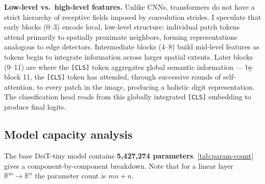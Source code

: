 \documentclass[11pt]{article}
\begin{document}
\textbf{Low-level vs.\ high-level features.} Unlike CNNs, transformers do not have a strict hierarchy of receptive fields imposed by convolution strides. I speculate that early blocks (0--3) encode local, low-level structure: individual patch tokens attend primarily to spatially proximate neighbors, forming representations analogous to edge detectors. Intermediate blocks (4--8) build mid-level features as tokens begin to integrate information across larger spatial extents. Later blocks (9--11) are where the \texttt{[CLS]} token aggregates global semantic information — by block 11, the \texttt{[CLS]} token has attended, through successive rounds of self-attention, to every patch in the image, producing a holistic digit representation. The classification head reads from this globally integrated \texttt{[CLS]} embedding to produce final logits.

\subsection{Model capacity analysis}\label{sec:model-capacity}

The base DeiT-tiny model contains \textbf{5,427,274 parameters}. \autoref{tab:param-count} gives a component-by-component breakdown. Note that for a linear layer $\mathbb{R}^{m} \to \mathbb{R}^{n}$ the parameter count is $mn + n$.
\end{document}

